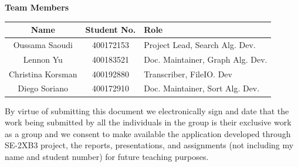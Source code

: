 \documentclass[12pt]{article}
\begin{document}
\Large \noindent \textbf{Team Members}\\
\normalsize
\begin{center}
    \begin{tabular}{|| c | c | l ||} 
    \hline
    Name & Student No. & Role\\
    \hline\hline
    Oussama Saoudi & 400172153 & Project Lead, Search Alg. Dev. \\ 
    \hline
    Lennon Yu & 400183521 & Doc. Maintainer, Graph Alg. Dev. \\
    \hline
    Christina Korsman & 400192880 & Transcriber, FileIO. Dev \\
    \hline
    Diego Soriano & 400172910 & Doc. Maintainer, Sort Alg. Dev. \\
    \hline
\end{tabular}
\end{center}
 
\normalsize
By virtue of submitting this document we electronically sign and date
that the work being submitted by all the individuals in the group is
their exclusive work as a group and we consent to make available the
application developed through SE-2XB3 project, the reports,
presentations, and assignments (not including my name and student number)
for future teaching purposes. 
 
\end{document}
